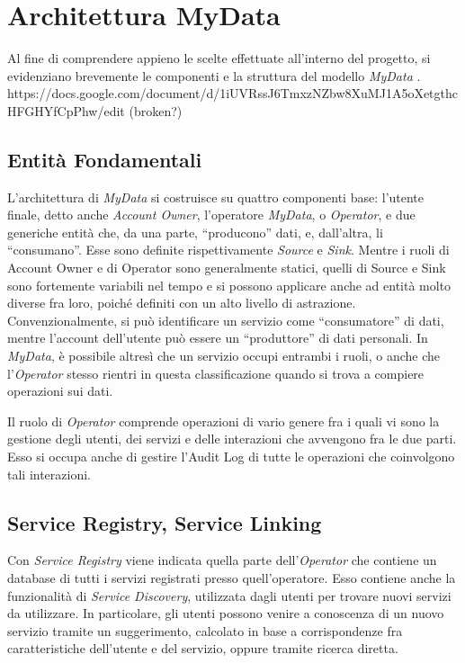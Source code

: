 \chapter{Architettura MyData}
\label{capitolo3}
\thispagestyle{empty}

\noindent Al fine di comprendere appieno le scelte effettuate all’interno del progetto, si evidenziano brevemente le componenti e la struttura del modello \textit{MyData} \cite{githubmydatastack}. 
https://docs.google.com/document/d/1iUVRssJ6TmxzNZbw8XuMJ1A5oXetgthcHFGHYfCpPhw/edit (broken?)

\section{Entit\`a Fondamentali}
L’architettura di \textit{MyData} si costruisce su quattro componenti base: l’utente finale, detto anche \textit{Account Owner}, l’operatore \textit{MyData}, o \textit{Operator}, e due generiche entit\`a che, da una parte, “producono” dati, e, dall’altra, li “consumano”. Esse sono definite rispettivamente \textit{Source} e \textit{Sink}. Mentre i ruoli di Account Owner e di Operator sono generalmente statici, quelli di Source e Sink sono fortemente variabili nel tempo e si possono applicare anche ad entit\`a molto diverse fra loro, poich\'e definiti con un alto livello di astrazione. Convenzionalmente, si pu\`o identificare un servizio come “consumatore” di dati, mentre l’account dell’utente pu\`o essere un “produttore” di dati personali. In \textit{MyData}, \`e possibile altres\`i che un servizio occupi entrambi i ruoli, o anche che l’\textit{Operator} stesso rientri in questa classificazione quando si trova a compiere operazioni sui dati.

Il ruolo di \textit{Operator} comprende operazioni di vario genere fra i quali vi sono la gestione degli utenti, dei servizi e delle interazioni che avvengono fra le due parti. Esso si occupa anche di gestire l’Audit Log di tutte le operazioni che coinvolgono tali interazioni.

\section{Service Registry, Service Linking}
Con \textit{Service Registry} viene indicata quella parte dell’\textit{Operator} che contiene un database di tutti i servizi registrati presso quell’operatore. Esso contiene anche la funzionalit\`a di \textit{Service Discovery}, utilizzata dagli utenti per trovare nuovi servizi da utilizzare. In particolare, gli utenti possono venire a conoscenza di un nuovo servizio tramite un suggerimento, calcolato in base a corrispondenze fra caratteristiche dell’utente e del servizio, oppure tramite ricerca diretta.

